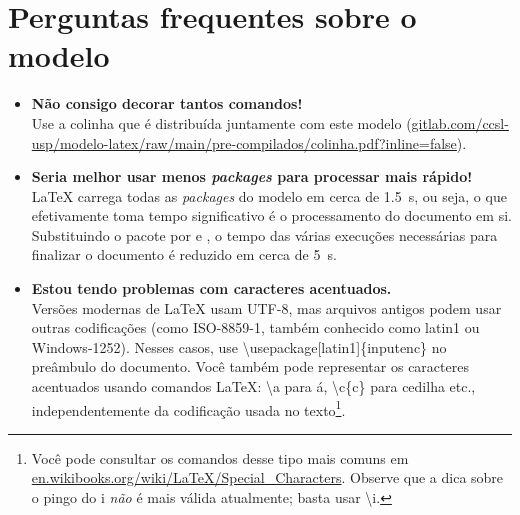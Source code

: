 
\chapter{Perguntas frequentes sobre o modelo}

\begin{itemize}

\item \textbf{Não consigo decorar tantos comandos!}\\
Use a colinha que é distribuída juntamente com este modelo (\url{gitlab.com/ccsl-usp/modelo-latex/raw/main/pre-compilados/colinha.pdf?inline=false}).

\item \textbf{Seria melhor usar menos \textit{packages} para processar mais rápido!}\\
\LaTeX{} carrega todas as \textit{packages} do modelo em cerca de \qty{1.5}{s}, ou seja, o que efetivamente toma tempo significativo é o processamento do documento em si. Substituindo o pacote  por  e , o tempo das várias execuções necessárias para finalizar o documento é reduzido em cerca de \qty{5}{s}.

\item \textbf{Estou tendo problemas com caracteres acentuados.}\\
Versões modernas de \LaTeX{} usam UTF-8, mas arquivos antigos podem usar outras codificações (como ISO-8859-1, também conhecido como latin1 ou Windows-1252). Nesses casos, use \textsf{\textbackslash{}usepackage[latin1]\{inputenc\}} no preâmbulo do documento. Você também pode representar os caracteres acentuados usando comandos \LaTeX{}: \textsf{\textbackslash\textquotesingle{}a} para á, \textsf{\textbackslash{}c\{c\}} para cedilha etc., independentemente da codificação usada no texto\footnote{Você pode consultar os comandos desse tipo mais comuns em \url{en.wikibooks.org/wiki/LaTeX/Special_Characters}. Observe que a dica sobre o pingo do i \emph{não} é mais válida atualmente; basta usar \textsf{\textbackslash\textquotesingle{}i}.}.



\end{itemize}
